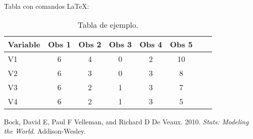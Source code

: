 \documentclass[12pt,reqno,oneside,pdftex]{formato-puc/puctesis} %
\begin{document}
Tabla con comandos \LaTeX:

\begin{table}[h]
\centering
\begin{tabular}{l*{6}{c}r}
Variable              & Obs 1 & Obs 2 & Obs 3 & Obs 4 & Obs 5\\
\hline
V1 & 6 & 4 & 0 & 2 & 10 \\
V2            & 6 & 3 & 0 & 3 &  8 \\
V3           & 6 & 2 & 1 & 3 &  7 \\
V4     & 6 & 2 & 1 & 3 &  5 \\
\end{tabular}
    \caption{Tabla de ejemplo.}
\end{table}

\hypertarget{refs}{}
\begin{CSLReferences}{1}{0}
\leavevmode\hypertarget{ref-bock2010stats}{}%
Bock, David E, Paul F Velleman, and Richard D De Veaux. 2010.
\emph{Stats: Modeling the World}. Addison-Wesley.

\end{CSLReferences}




\cleardoublepage
\nocite{*} %
 








\end{document}
